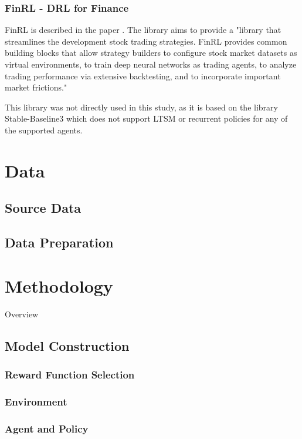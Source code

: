 \documentclass[oneside,12pt]{Classes/RoboticsLaTeX}
\begin{document}
\begin{itemize}
\subsection{FinRL - DRL for Finance}
FinRL is described in the paper \citet{finrl2020}. The library aims to provide a "library that streamlines the development stock trading strategies. FinRL provides common building blocks that allow strategy builders to configure stock market datasets as virtual environments, to train deep neural networks as trading agents, to analyze trading performance via extensive backtesting, and to incorporate important market frictions." \citet[p.2]{finrl2020}

This library was not directly used in this study, as it is based on the library Stable-Baseline3 \citep{stable-baselines3} which does not support LTSM or recurrent policies for any of the supported agents.

\chapter{Data}
\label{chap:data}
\section{Source Data}

\section{Data Preparation}


\chapter{Methodology}
\label{chap:methodology}
Overview
\section{Model Construction}
\subsection{Reward Function Selection}

\subsection{Environment}


\subsection{Agent and Policy}


\end{itemize}
\end{document}
